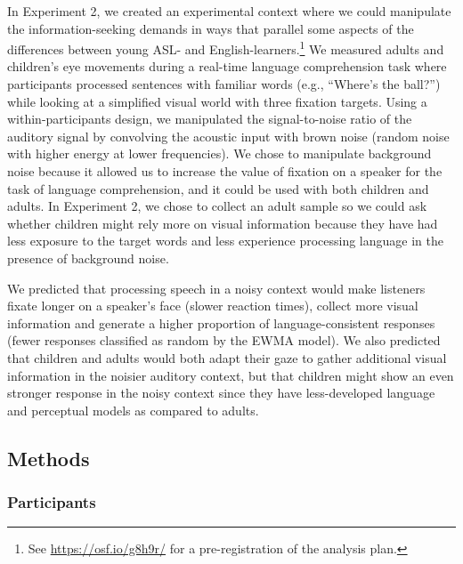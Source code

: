 \documentclass[,man,floatsintext]{apa6}
\let\rmarkdownfootnote\footnote%
\def\footnote{\protect\rmarkdownfootnote}
\begin{document}
In Experiment 2, we created an experimental context where we could manipulate the information-seeking demands in ways that parallel some aspects of the differences between young ASL- and English-learners.\footnote{See \url{https://osf.io/g8h9r/} for a pre-registration of the analysis plan.} We measured adults and children's eye movements during a real-time language comprehension task where participants processed sentences with familiar words (e.g., \enquote{Where's the ball?}) while looking at a simplified visual world with three fixation targets. Using a within-participants design, we manipulated the signal-to-noise ratio of the auditory signal by convolving the acoustic input with brown noise (random noise with higher energy at lower frequencies). We chose to manipulate background noise because it allowed us to increase the value of fixation on a speaker for the task of language comprehension, and it could be used with both children and adults. In Experiment 2, we chose to collect an adult sample so we could ask whether children might rely more on visual information because they have had less exposure to the target words and less experience processing language in the presence of background noise.

We predicted that processing speech in a noisy context would make listeners fixate longer on a speaker's face (slower reaction times), collect more visual information and generate a higher proportion of language-consistent responses (fewer responses classified as random by the EWMA model). We also predicted that children and adults would both adapt their gaze to gather additional visual information in the noisier auditory context, but that children might show an even stronger response in the noisy context since they have less-developed language and perceptual models as compared to adults.

\hypertarget{methods-1}{%
\subsection{Methods}\label{methods-1}}

\hypertarget{participants-1}{%
\subsubsection{Participants}\label{participants-1}}
\end{document}
